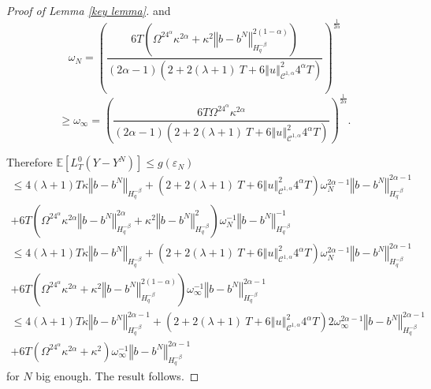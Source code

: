 \documentclass[11pt]{enstaPRE}
\newcommand{\norme}[1]{\left\Vert #1\right\Vert}
\newcommand{\E}{\mathbb{E}}
\begin{document}
\begin{proof}[Proof of Lemma \ref{key lemma}]
    and \begin{equation*}
    \omega_N = \left(\frac{6T\left(\Omega^24^{\alpha}\kappa^{2\alpha} +\kappa^2\norme{b-b^N}_{H^{-\beta}_{q}}^{2(1-\alpha)}\right)}{(2\alpha-1)\left(2 + 2(\lambda + 1)\ T + 6\norme{u}_{\mathcal{C}^{1,\alpha}}^2 4^{\alpha}T\right)}\right)^{\frac{1}{2\alpha}}
    \end{equation*}
    \begin{equation*}
    \geq\omega_\infty=\left(\frac{6T\Omega^24^{\alpha}\kappa^{2\alpha} }{(2\alpha-1)\left(2 + 2(\lambda + 1)\ T + 6\norme{u}_{\mathcal{C}^{1,\alpha}}^2 4^{\alpha}T\right)}\right)^{\frac{1}{2\alpha}}.
    \end{equation*}
    
    Therefore $
    \E\left[L^0_T(Y-Y^N)\right]\leq g(\varepsilon_N)
    $
    \begin{multline*}
    \leq 4(\lambda + 1)T\kappa\norme{b-b^N}_{H^{-\beta}_{q}} + \left(2 + 2(\lambda + 1)\ T + 6\norme{u}_{\mathcal{C}^{1,\alpha}}^2 4^{\alpha}T\right) \omega_N^{2\alpha-1}\norme{b-b^N}_{H^{-\beta}_{q}}^{2\alpha-1} \\ + 6T\left(\Omega^24^{\alpha}\kappa^{2\alpha} \norme{b-b^N}_{H^{-\beta}_q}^{2\alpha}+\kappa^2\norme{b-b^N}_{H^{-\beta}_{q}}^2\right)\omega_N^{-1}\norme{b-b^N}_{H^{-\beta}_{q}}^{-1}
    \end{multline*} 
    \begin{multline*}
    \leq 4(\lambda + 1)T\kappa\norme{b-b^N}_{H^{-\beta}_{q}} + \left(2 + 2(\lambda + 1)\ T + 6\norme{u}_{\mathcal{C}^{1,\alpha}}^2 4^{\alpha}T\right) \omega_N^{2\alpha-1}\norme{b-b^N}_{H^{-\beta}_{q}}^{2\alpha-1} \\ + 6T\left(\Omega^24^{\alpha}\kappa^{2\alpha} +\kappa^2\norme{b-b^N}_{H^{-\beta}_{q}}^{2(1-\alpha)}\right)\omega_\infty^{-1}\norme{b-b^N}_{H^{-\beta}_{q}}^{2\alpha-1}
    \end{multline*}   
    \begin{multline*}
    \leq 4(\lambda + 1)T\kappa\norme{b-b^N}_{H^{-\beta}_{q}}^{2\alpha-1} + \left(2 + 2(\lambda + 1)\ T + 6\norme{u}_{\mathcal{C}^{1,\alpha}}^2 4^{\alpha}T\right)2 \omega_\infty^{2\alpha-1}\norme{b-b^N}_{H^{-\beta}_{q}}^{2\alpha-1} \\ + 6T\left(\Omega^24^{\alpha}\kappa^{2\alpha} +\kappa^2\right)\omega_\infty^{-1}\norme{b-b^N}_{H^{-\beta}_{q}}^{2\alpha-1}
    \end{multline*}
    for $N$ big enough. The result follows.
\end{proof}

\listoffigures



\end{document}
